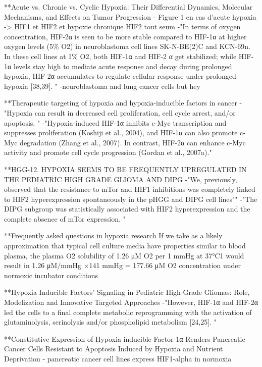 \documentclass[11pt,a4paper]{article}
\begin{document}
**Acute vs. Chronic vs. Cyclic Hypoxia: Their Differential Dynamics, Molecular Mechanisms, and Effects on Tumor Progression
- Figure 1 en cas d'acute hypoxia -> HIF1 et HIF2 et hypoxie chronique HIF2 tout seum
-"In terms of oxygen concentration, HIF-2α is seen to be more stable compared to HIF-1α at higher oxygen levels (5\% O2) in neuroblastoma cell lines SK-N-BE(2)C and KCN-69n. In these cell lines at 1\% O2, both HIF-1α and HIF-2 α get stabilized; while HIF-1α levels stay high to mediate acute response and decay during prolonged hypoxia, HIF-2α accumulates to regulate cellular response under prolonged hypoxia [38,39]. "
-neuroblastoma and lung cancer cells but hey 


**Therapeutic targeting of hypoxia and hypoxia-inducible factors in cancer
-"Hypoxia can result in decreased cell proliferation, cell cycle arrest, and/or apoptosis. "
-"Hypoxia-induced HIF-1α inhibits c-Myc transcription and suppresses proliferation (Koshiji et al., 2004), and HIF-1α can also promote c-Myc degradation (Zhang et al., 2007). In contrast, HIF-2α can enhance c-Myc activity and promote cell cycle progression (Gordan et al., 2007a)."

**HGG-12. HYPOXIA SEEMS TO BE FREQUENTLY UPREGULATED IN THE PEDIATRIC HIGH GRADE GLIOMA AND DIPG
-"We, previously,
observed that the resistance to mTor and HIF1 inhibitions was completely
linked to HIF2 hyperexpression spontaneously in the pHGG and DIPG
cell lines""
-"The DIPG subgroup was statistically associated with HIF2 hyperexpression and the complete absence of mTor expression. "

**Frequently asked questions in hypoxia research
If we take as a likely approximation that typical cell culture media have properties similar to blood plasma, the plasma O2 solubility of 1.26 μM O2 per 1 mmHg at 37°C1 would result in 1.26 μM/mmHg ×141 mmHg = 177.66 μM O2 concentration under normoxic incubator conditions

**Hypoxia Inducible Factors’ Signaling in Pediatric High-Grade Gliomas: Role, Modelization and Innovative Targeted Approaches
-"However, HIF-1α and HIF-2α led the cells to a final complete metabolic reprogramming with the activation of glutaminolysis, serinolysis and/or phospholipid metabolism [24,25]. "

**Constitutive Expression of Hypoxia-inducible Factor-1α Renders Pancreatic Cancer Cells Resistant to Apoptosis Induced by Hypoxia and Nutrient Deprivation
- pancreatic cancer cell lines express HIF1-alpha in normoxia
\end{document}
